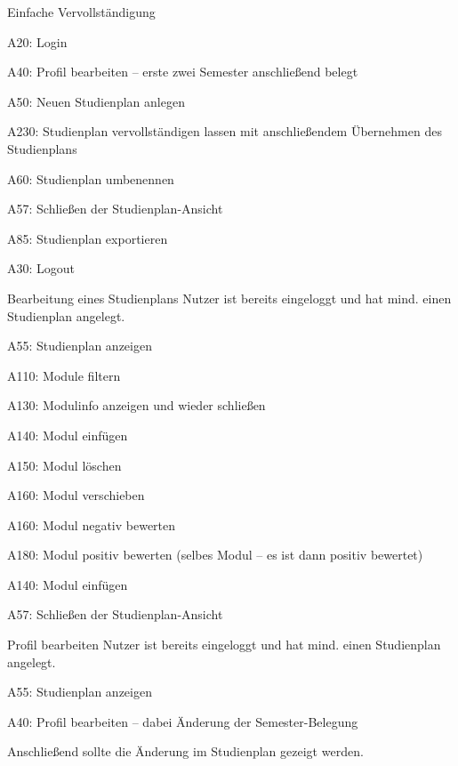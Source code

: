 \begin{scenario}{Einfache Vervollständigung}
	\item A20: Login
	\item A40: Profil bearbeiten – erste zwei Semester anschließend belegt
	\item A50: Neuen Studienplan anlegen
	\item A230: Studienplan vervollständigen lassen mit anschließendem Übernehmen des {Studienplans}
	\item A60: Studienplan umbenennen 
	\item A57: Schließen der Studienplan-Ansicht
	\item A85: Studienplan exportieren
	\item A30: Logout
\end{scenario}

\begin{scenario*}{Bearbeitung eines Studienplans}
	{{Nutzer} ist bereits eingeloggt und hat mind. einen {Studienplan} angelegt.}
	\item A55: Studienplan anzeigen
	\item A110: Module filtern 
	\item A130: Modulinfo anzeigen und wieder schließen
	\item A140: Modul einfügen
	\item A150: Modul löschen
	\item A160: Modul verschieben
	\item A160: Modul negativ bewerten
	\item A180: Modul positiv bewerten (selbes {Modul} – es ist dann positiv bewertet) 
	\item A140: Modul einfügen
	\item A57: Schließen der Studienplan-Ansicht
\end{scenario*}

\begin{scenario*}{Profil bearbeiten}
	{{Nutzer} ist bereits eingeloggt und hat mind. einen {Studienplan} angelegt.}
	\item A55: Studienplan anzeigen
	\item A40: Profil bearbeiten – dabei Änderung der Semester-Belegung
	\item Anschließend sollte die Änderung im Studienplan gezeigt werden.
\end{scenario*}

